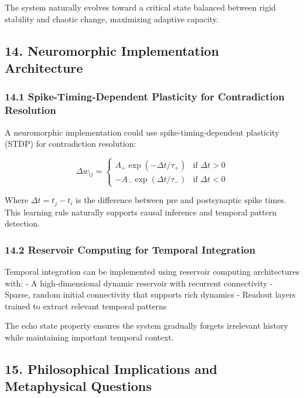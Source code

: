 \documentclass[
]{article}
\begin{document}
The system naturally evolves toward a critical state balanced between
rigid stability and chaotic change, maximizing adaptive capacity.

\subsection{14. Neuromorphic Implementation
Architecture}\label{neuromorphic-implementation-architecture}

\subsubsection{14.1 Spike-Timing-Dependent Plasticity for Contradiction
Resolution}\label{spike-timing-dependent-plasticity-for-contradiction-resolution}

A neuromorphic implementation could use spike-timing-dependent
plasticity (STDP) for contradiction resolution:

\[\Delta w_{ij} = \begin{cases}
A_+ \exp(-\Delta t/\tau_+) & \text{if } \Delta t > 0 \\
-A_- \exp(\Delta t/\tau_-) & \text{if } \Delta t < 0
\end{cases}\]

Where \(\Delta t = t_j - t_i\) is the difference between pre and
postsynaptic spike times. This learning rule naturally supports causal
inference and temporal pattern detection.

\subsubsection{14.2 Reservoir Computing for Temporal
Integration}\label{reservoir-computing-for-temporal-integration}

Temporal integration can be implemented using reservoir computing
architectures with: - A high-dimensional dynamic reservoir with
recurrent connectivity - Sparse, random initial connectivity that
supports rich dynamics - Readout layers trained to extract relevant
temporal patterns

The echo state property ensures the system gradually forgets irrelevant
history while maintaining important temporal context.

\subsection{15. Philosophical Implications and Metaphysical
Questions}\label{philosophical-implications-and-metaphysical-questions}
\end{document}
